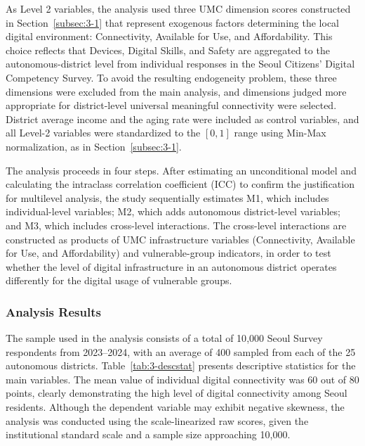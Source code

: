 As Level 2 variables, the analysis used three UMC dimension scores constructed in Section~\ref{subsec:3-1} that represent exogenous factors determining the local digital environment: Connectivity, Available for Use, and Affordability. This choice reflects that Devices, Digital Skills, and Safety are aggregated to the autonomous-district level from individual responses in the Seoul Citizens' Digital Competency Survey. To avoid the resulting endogeneity problem, these three dimensions were excluded from the main analysis, and dimensions judged more appropriate for district-level universal meaningful connectivity were selected. District average income and the aging rate were included as control variables, and all Level-2 variables were standardized to the $[0,1]$ range using Min-Max normalization, as in Section~\ref{subsec:3-1}.

The analysis proceeds in four steps. After estimating an unconditional model and calculating the intraclass correlation coefficient (ICC) to confirm the justification for multilevel analysis, the study sequentially estimates M1, which includes individual-level variables; M2, which adds autonomous district-level variables; and M3, which includes cross-level interactions. The cross-level interactions are constructed as products of UMC infrastructure variables (Connectivity, Available for Use, and Affordability) and vulnerable-group indicators, in order to test whether the level of digital infrastructure in an autonomous district operates differently for the digital usage of vulnerable groups.

\subsubsection{Analysis Results}
\label{subsubsec:3-2-2}

The sample used in the analysis consists of a total of 10{,}000 Seoul Survey respondents from 2023--2024, with an average of 400 sampled from each of the 25 autonomous districts. Table~\ref{tab:3-descstat} presents descriptive statistics for the main variables. The mean value of individual digital connectivity was 60 out of 80 points, clearly demonstrating the high level of digital connectivity among Seoul residents. Although the dependent variable may exhibit negative skewness, the analysis was conducted using the scale-linearized raw scores, given the institutional standard scale and a sample size approaching 10{,}000.

